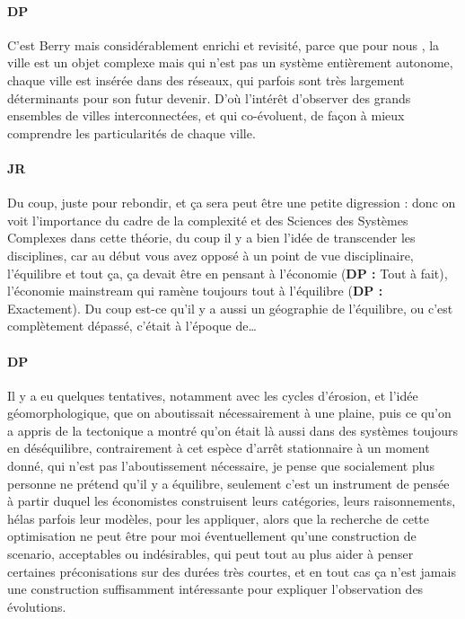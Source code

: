\paragraph{DP}

C'est Berry mais considérablement enrichi et revisité, parce que pour nous , la ville est un objet complexe mais qui n'est pas un système entièrement autonome, chaque ville est insérée dans des réseaux, qui parfois sont très largement déterminants pour son futur devenir. D'où l'intérêt d'observer des grands ensembles de villes interconnectées, et qui co-évoluent, de façon à mieux comprendre les particularités de chaque ville.

\paragraph{JR}

Du coup, juste pour rebondir, et ça sera peut être une petite digression : donc on voit l'importance du cadre de la complexité et des Sciences des Systèmes Complexes dans cette théorie, du coup il y a bien l'idée de transcender les disciplines, car au début vous avez opposé à un point de vue disciplinaire, l'équilibre et tout ça, ça devait être en pensant à l'économie (\textbf{DP : } Tout à fait), l'économie mainstream qui ramène toujours tout à l'équilibre (\textbf{DP : }Exactement). Du coup est-ce qu'il y a aussi un géographie de l'équilibre, ou c'est complètement dépassé, c'était à l'époque de\ldots

\paragraph{DP}

Il y a eu quelques tentatives, notamment avec les cycles d'érosion, et l'idée géomorphologique, que on aboutissait nécessairement à une plaine, puis ce qu'on a appris de la tectonique a montré qu'on était là aussi dans des systèmes toujours en déséquilibre, contrairement à cet espèce d'arrêt stationnaire à un moment donné, qui n'est pas l'aboutissement nécessaire, je pense que socialement plus personne ne prétend qu'il y a équilibre, seulement c'est un instrument de pensée à partir duquel les économistes construisent leurs catégories, leurs raisonnements, hélas parfois leur modèles, pour les appliquer, alors que la recherche de cette optimisation ne peut être pour moi éventuellement qu'une construction de scenario, acceptables ou indésirables, qui peut tout au plus aider à penser certaines préconisations sur des durées très courtes, et en tout cas ça n'est jamais une construction suffisamment intéressante pour expliquer l'observation des évolutions.


